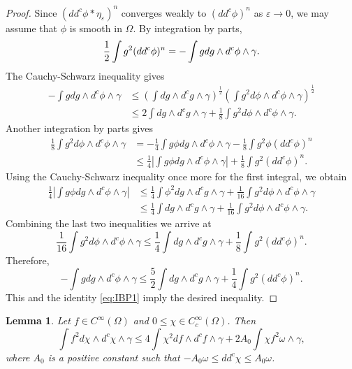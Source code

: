 \documentclass{amsart}
\newcommand{\veps}{\varepsilon}
\newcommand{\ga}{\gamma}
\newcommand{\om}{\omega}
\newcommand{\Om}{\Omega}
\newtheorem{lem}[thm]{Lemma}
\theoremstyle{definition}
\numberwithin{thm}{section}
\numberwithin{equation}{section}
\renewcommand{\[}{\begin{equation}}
\renewcommand{\]}{\end{equation}}
\newcommand{\wed}{\wedge}
\begin{document}
\begin{proof} Since $(dd^c\phi *\eta_\veps)^n$ converges weakly to $(dd^c\phi)^n$ as $\veps\to 0$, we may assume that $\phi$ is smooth in $\Om$. By integration by parts,
\[\label{eq:IBP1}
	\frac{1}{2}\int g^2 (dd^c\phi)^n = -\int g dg \wed d^c \phi \wed \ga. \\
\]
The Cauchy-Schwarz inequality gives
$$\begin{aligned}	
 -\int g dg \wed d^c \phi \wed \ga   &\leq  \left( \int dg \wed d^c g \wed \ga \right)^\frac{1}{2} \left( \int g^2 d\phi\wed d^c\phi \wed\ga \right)^\frac{1}{2} \\
&	\leq 2\int dg \wed d^c g \wed \ga + \frac{1}{8} \int g^2 d\phi \wed d^c\phi \wed\ga.
\end{aligned}$$
Another integration by parts gives
$$\begin{aligned}
	\frac{1}{8}\int g^2 d\phi \wed d^c\phi \wed\ga &= -\frac{1}{4}\int g \phi dg\wed d^c\phi \wed\ga - \frac{1}{8}\int g^2 \phi (dd^c\phi)^n \\
&\leq		\frac{1}{4}\left| \int g \phi dg\wed d^c\phi \wed\ga \right| + \frac{1}{8}\int g^2 (dd^c\phi)^n.
\end{aligned}$$
Using the Cauchy-Schwarz inequality once more for the first integral, we obtain
$$\begin{aligned}
\frac{1}{4}\left| \int g \phi dg\wed d^c\phi \wed\ga \right|  &\leq \frac{1}{4}\int \phi^2 dg \wed d^c g \wed \ga + \frac{1}{16}\int g^2 d\phi \wed d^c \phi \wed\ga \\
&\leq		\frac{1}{4} \int dg \wed d^c g \wed \ga +  \frac{1}{16}\int g^2 d\phi \wed d^c \phi \wed\ga.
\end{aligned}$$
Combining the last two inequalities we arrive at
$$
	\frac{1}{16}\int g^2 d\phi \wed d^c \phi \wed \ga   \leq   \frac{1}{4}   \int dg\wed d^c g\wed \ga+ \frac{1}{8}  \int g^2 (dd^c\phi)^n .
$$
Therefore,
$$
	 -\int g dg \wed d^c \phi \wed \ga   \leq  \frac{5}{2} \int dg \wed d^c g\wed \ga + \frac{1}{4} \int g^2 (dd^c\phi)^n. 
$$
This and the  identity \eqref{eq:IBP1} imply the desired inequality.
\end{proof}


\begin{lem}\label{lem:extra-grad} Let $f\in C^\infty(\Om)$ and $0\leq \chi \in C^\infty_c(\Om)$. Then
$$
	\int f^2 d\chi \wed d^c \chi \wed \ga \leq 4 \int \chi^2 df \wed d^c f \wed \ga +  2A_0\int \chi f^2 \om\wed\ga, 
$$
where $A_0$ is a positive constant such that $-A_0 \om \leq dd^c\chi \leq A_0\om$.
\end{lem}
\end{document}
